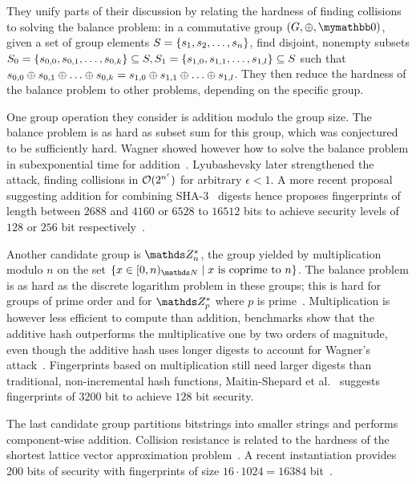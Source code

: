 \documentclass[conference]{IEEEtran}
\begin{document}
They unify parts of their discussion by relating the hardness of finding collisions to solving the balance problem: in a commutative group $(G, \groupaddsym, \neutraladd)$, given a set of group elements $S = \{s_1, s_2, \ldots, s_n\}$, find disjoint, nonempty subsets $S_0 = \{s_{0, 0}, s_{0, 1}, \ldots, s_{0, k}\} \subseteq S, S_1 = \{s_{1, 0}, s_{1, 1}, \ldots, s_{1, l}\} \subseteq S$ such that $s_{0, 0} \oplus s_{0, 1}  \oplus \ldots  \oplus s_{0, k} = s_{1, 0}  \oplus s_{1, 1}  \oplus \ldots  \oplus s_{1, l}$. They then reduce the hardness of the balance problem to other problems, depending on the specific group.

One group operation they consider is addition modulo the group size. The balance problem is as hard as subset sum for this group, which was conjectured to be sufficiently hard. Wagner showed however how to solve the balance problem in subexponential time for addition~\cite{wagner2002generalized}. Lyubashevsky later strengthened the attack, finding collisions in $\mathcal{O}(2^{n^\epsilon})$ for arbitrary $\epsilon < 1$. A more recent proposal suggesting addition for combining SHA-3~\cite{dworkin2015sha} digests hence proposes fingerprints of length between $2688$ and $4160$ or $6528$ to $16512$ bits to achieve security levels of $128$ or $256$ bit respectively~\cite{mihajloska2015reviving}.

Another candidate group is $\Z_n^\ast$, the group yielded by multiplication modulo $n$ on the set $\set{x \in \range{0}{n}{\N} \mid \text{$x$ is coprime to $n$}}$. The balance problem is as hard as the discrete logarithm problem in these groups; this is hard for groups of prime order and for $\Z_p^\ast$ where $p$ is prime~\cite{bellare1997new}. Multiplication is however less efficient to compute than addition, benchmarks show that the additive hash outperforms the multiplicative one by two orders of magnitude, even though the additive hash uses longer digests to account for Wagner's attack~\cite{stanton2010fastad}. Fingerprints based on multiplication still need larger digests than traditional, non-incremental hash functions, Maitin-Shepard et al.~\cite{maitin2017elliptic} suggests fingerprints of $3200$ bit to achieve $128$ bit security.

The last candidate group partitions bitstrings into smaller strings and performs component-wise addition. Collision resistance is related to the hardness of the shortest lattice vector approximation problem~\cite{ajtai1996generating}. A recent instantiation provides 200 bits of security with fingerprints of size $16 \cdot 1024 = 16384$ bit~\cite{lewi2019securing}.
\end{document}

